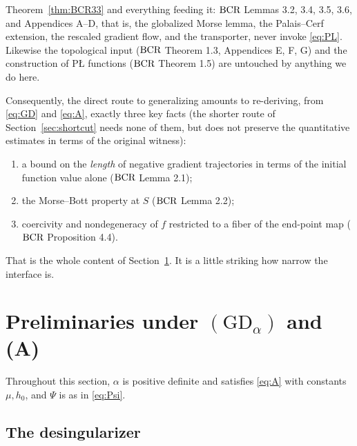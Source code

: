 \documentclass[11pt]{article}
\theoremstyle{plain}
\theoremstyle{definition}
\theoremstyle{remark}
\newcommand{\bcr}{\textup{BCR}}
\begin{document}
Theorem~\ref{thm:BCR33} and everything feeding it: $\bcr$ Lemmas 3.2, 3.4,
3.5, 3.6, and Appendices A--D, that is, the globalized Morse lemma, the
Palais--Cerf extension, the rescaled gradient flow, and the transporter,
never invoke \eqref{eq:PL}. Likewise the topological input ($\bcr$
Theorem 1.3, Appendices E, F, G) and the construction of P\L{} functions
($\bcr$ Theorem 1.5) are untouched by anything we do here.

Consequently, the direct route to generalizing \cite{BCR2026} amounts to
re-deriving, from \eqref{eq:GD} and \eqref{eq:A}, exactly three key facts (the
shorter route of Section~\ref{sec:shortcut} needs none of them, but does not
preserve the quantitative estimates in terms of the original witness):
\begin{enumerate}
\item[(I1)] a bound on the \emph{length} of negative gradient trajectories in
terms of the initial function value alone ($\bcr$ Lemma 2.1);
\item[(I2)] the Morse--Bott property at $S$ ($\bcr$ Lemma 2.2);
\item[(I3)] coercivity and nondegeneracy of $f$ restricted to a fiber of the
end-point map ($\bcr$ Proposition 4.4).
\end{enumerate}
That is the whole content of Section~\ref{sec:preliminaries}. It is a little
striking how narrow the interface is.

\section{Preliminaries under $(\mathrm{GD}_\alpha)$ and {\rm(A)}}
\label{sec:preliminaries}

Throughout this section, $\alpha$ is positive definite and satisfies
\eqref{eq:A} with constants $\mu, h_0$, and $\Psi$ is as in \eqref{eq:Psi}.

\subsection{The desingularizer}
\end{document}
